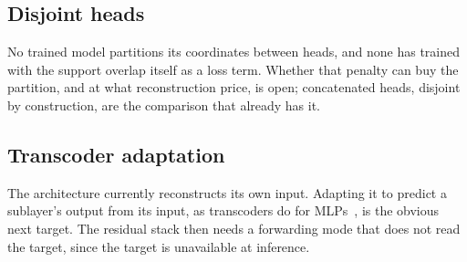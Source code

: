 \subsection{Disjoint heads}
No trained model partitions its coordinates between heads, and none has
trained with the support overlap itself as a loss term. Whether that
penalty can buy the partition, and at what reconstruction price, is open;
concatenated heads, disjoint by construction, are the comparison that
already has it.

\subsection{Transcoder adaptation}
The architecture currently reconstructs its own input. Adapting it to
predict a sublayer's output from its input, as transcoders do for
MLPs~\cite{dunefsky2024}, is the obvious next target. The residual stack
then needs a forwarding mode that does not read the target, since the
target is unavailable at inference.
